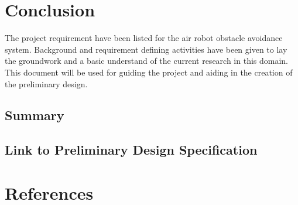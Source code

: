\documentclass[]{report}
\begin{document}

\chapter{Conclusion}

The project requirement have been listed for the air robot obstacle avoidance system. Background and requirement defining activities have been given to lay the groundwork and a basic understand of the current research in this domain. This document will be used for guiding the project and aiding in the creation of the preliminary design. 

\section{Summary}

\section{Link to Preliminary Design Specification}

\chapter*{References}

\printbibliography
\end{document}
